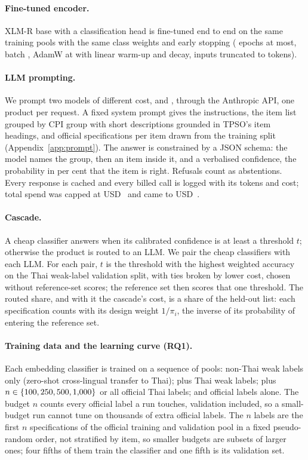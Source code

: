\paragraph{Fine-tuned encoder.} XLM-R base \citep[\texttt{\HfXlmr};][]{conneau2020xlmr} with a
classification head is fine-tuned end to end on the same training pools with the same class
weights and early stopping (\CfgFtEpochs{} epochs at most, batch \CfgFtBatch, AdamW at
\CfgFtLR{} with linear warm-up and decay, inputs truncated to \CfgFtMaxLen{} tokens).

\paragraph{LLM prompting.} We prompt two models of different cost, \NameOpus{} and \NameHaiku{},
through the Anthropic API, one product per request. A fixed system prompt gives the instructions, the
item list grouped by CPI group with short descriptions grounded in TPSO's item headings, and
\CfgFewShot{} official specifications per item drawn from the training split
(Appendix~\ref{app:prompt}). The answer is constrained by a JSON schema: the model names the
group, then an item inside it, and a verbalised confidence, the probability in per cent that the item is right. Refusals count as
abstentions. Every response is cached and every billed call is logged with its tokens and
cost; total spend was capped at USD~\CfgCapUSD{} and came to USD~\LLMSpendUSD.

\paragraph{Cascade.} A cheap classifier answers when its calibrated confidence is at least a
threshold $t$; otherwise the product is routed to an LLM. We pair the cheap classifiers with
each LLM. For each pair, $t$ is the threshold with the highest weighted accuracy on the Thai
weak-label validation split, with ties broken by lower cost, chosen without reference-set
scores; the reference set then scores that one threshold. The routed share, and with it the
cascade's cost, is a share of the held-out list: each specification counts with its design
weight $1/\pi_i$, the inverse of its probability of entering the reference set.

\paragraph{Training data and the learning curve (RQ1).} Each embedding classifier is trained
on a sequence of pools: non-Thai weak labels only (zero-shot cross-lingual transfer to Thai);
plus Thai weak labels; plus $n \in \{100, 250, 500, 1{,}000\}$ or all official Thai labels; and official
labels alone. The budget $n$ counts every official label a run touches, validation included,
so a small-budget run cannot tune on thousands of extra official labels. The $n$ labels are the
first $n$ specifications of the official training and validation pool in a fixed pseudo-random
order, not stratified by item, so smaller budgets are subsets of larger ones; four fifths of
them train the classifier and one fifth is its validation set.

